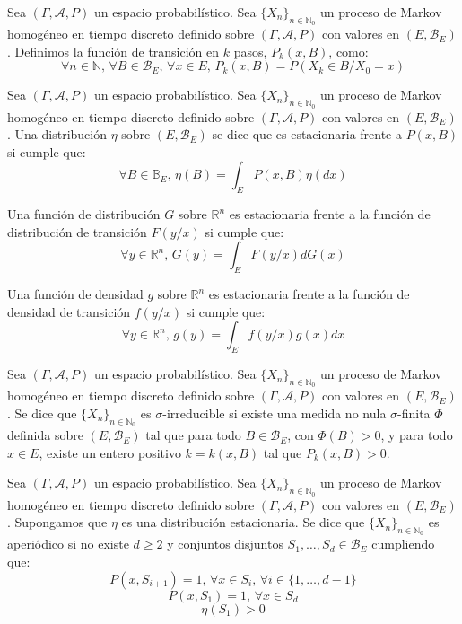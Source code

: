 \begin{definicion}
Sea $(\Gamma , \mathcal{A}, P)$ un espacio probabilístico. Sea $\{X_n\}_{n\in \mathds{N}_0}$ un proceso de Markov homogéneo en tiempo discreto definido sobre $(\Gamma, \mathcal{A}, P)$ con valores en $(E,\mathscr{B}_E)$. Definimos la función de transición en $k$ pasos, $P_k(x,B)$, como:
$$\forall n \in \mathds{N}\text{, }\forall B\in \mathscr{B}_E \text{, }\forall x\in E\text{, } P_k(x,B) = P(X_k\in B/X_0=x) $$
\end{definicion}

\begin{definicion}
Sea $(\Gamma , \mathcal{A}, P)$ un espacio probabilístico. Sea $\{X_n\}_{n\in \mathds{N}_0}$ un proceso de Markov homogéneo en tiempo discreto definido sobre $(\Gamma, \mathcal{A}, P)$ con valores en $(E,\mathscr{B}_E)$. Una distribución $\eta$ sobre $(E,\mathscr{B}_E)$ se dice que es estacionaria frente a $P(x,B)$ si cumple que:
$$\forall B\in\mathds{B}_E\text{, } \eta(B) = \int_E P(x,B) \eta(dx)$$

Una función de distribución $G$ sobre $\mathds{R}^n$ es estacionaria frente a la función de distribución de transición $F(y/x)$ si cumple que:
$$\forall y\in\mathds{R}^n\text{, } G(y) = \int_E F(y/x) dG(x)$$

Una función de densidad $g$ sobre $\mathds{R}^n$ es estacionaria frente a la función de densidad de transición $f(y/x)$ si cumple que:
$$\forall y\in\mathds{R}^n\text{, } g(y) = \int_E f(y/x) g(x)dx$$
\end{definicion}

\begin{definicion}
Sea $(\Gamma , \mathcal{A}, P)$ un espacio probabilístico. Sea $\{X_n\}_{n\in \mathds{N}_0}$ un proceso de Markov homogéneo en tiempo discreto definido sobre $(\Gamma, \mathcal{A}, P)$ con valores en $(E,\mathscr{B}_E)$. Se dice que $\{X_n\}_{n\in \mathds{N}_0}$ es $\sigma$-irreducible si existe una medida no nula $\sigma$-finita $\Phi$ definida sobre $(E,\mathscr{B}_E)$ tal que para todo $B\in \mathscr{B}_E$, con $\Phi(B)>0$, y para todo $x\in E$, existe un entero positivo $k = k(x,B)$ tal que $P_k(x,B)>0$.
\end{definicion}

\begin{definicion}
Sea $(\Gamma , \mathcal{A}, P)$ un espacio probabilístico. Sea $\{X_n\}_{n\in \mathds{N}_0}$ un proceso de Markov homogéneo en tiempo discreto definido sobre $(\Gamma, \mathcal{A}, P)$ con valores en $(E,\mathscr{B}_E)$. Supongamos que $\eta$ es una distribución estacionaria. Se dice que $\{X_n\}_{n\in \mathds{N}_0}$ es aperiódico si no existe $d\geq 2$ y conjuntos disjuntos $S_1,\ldots ,S_d \in \mathscr{B}_E$ cumpliendo que:
$$P(x,S_{i+1}) = 1\text{, }\forall x\in S_i\text{, }\forall i\in \{1,\ldots ,d-1\} $$
$$P(x,S_1) = 1\text{, }\forall x\in S_d$$
$$\eta(S_1)>0$$
\end{definicion}

